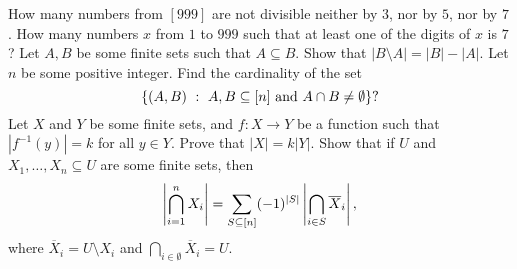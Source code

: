 \begin{chapterendexercises}
  \exercise[recommended] How many numbers from $[999]$ are not divisible neither by $3$,
    nor by $5$, nor by $7$.
  \exercise How many numbers $x$ from $1$ to $999$ such that at least one
    of the digits of $x$ is $7$?
  \exercise Let $A, B$ be some finite sets such that $A \subseteq B$.
    Show that $|B \setminus A| = |B| - |A|$.
  \exercise[recommended] Let $n$ be some positive integer.
    Find the cardinality of the set
    \[
      \set[{A, B \subseteq \range{n} \text{ and } A \cap B \neq \emptyset}]{(A, B)}?
    \]
  \exercise Let $X$ and $Y$ be some finite sets, and $f : X \to Y$ be a function
    such that $|f^{-1}(y)| = k$ for all $y \in Y$. Prove that $|X| = k|Y|$.
  \exercise[recommended] Show that if $U$ and $X_1, \dots, X_n \subseteq U$ are
    some finite sets, then
    \[
      \left| \bigcap_{i = 1}^n X_i \right| =
      \sum_{S \subseteq {[{n}]}} (-1)^{|S|}
        \left| \bigcap_{i \in S} \overline{X}_i \right|,
    \]
    where $\overline{X}_i = U \setminus X_i$ and
    $\bigcap_{i \in \emptyset} \overline{X}_i = U$.
\end{chapterendexercises}

